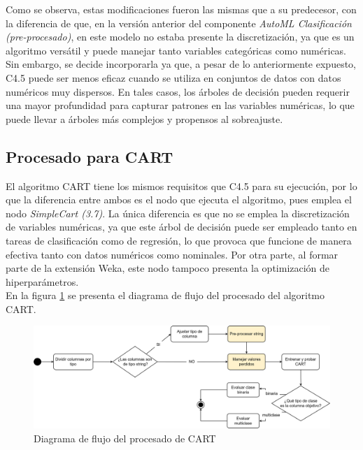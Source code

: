 Como se observa, estas modificaciones fueron las mismas que a su predecesor, con la diferencia de que, en la versión anterior del componente \textit{AutoML Clasificación (pre-procesado)}, en este modelo no estaba presente la discretización, ya que es un algoritmo versátil y puede manejar tanto variables categóricas como numéricas. Sin embargo, se decide incorporarla ya que, a pesar de lo anteriormente expuesto, C4.5 puede ser menos eficaz cuando se utiliza en conjuntos de datos con datos numéricos muy dispersos. En tales casos, los árboles de decisión pueden requerir una mayor profundidad para capturar patrones en las variables numéricas, lo que puede llevar a árboles más complejos y propensos al sobreajuste. 

\subsection{Procesado para CART}
El algoritmo CART tiene los mismos requisitos que C4.5 para su ejecución, por lo que la diferencia entre ambos es el nodo que ejecuta el algoritmo, pues emplea el nodo \textit{SimpleCart (3.7)}. La única diferencia es que no se emplea la discretización de variables numéricas, ya que este árbol de decisión puede ser empleado tanto en tareas de clasificación como de regresión, lo que provoca que funcione de manera efectiva tanto con datos numéricos como nominales. Por otra parte, al formar parte de la extensión Weka, este nodo tampoco presenta la optimización de hiperparámetros. \\
En la figura \ref{fig:procesado-cart} se presenta el diagrama de flujo del procesado del algoritmo CART.

\begin{figure}[H]
	\centering
	\includegraphics[width=1\linewidth]{"figuras/capi 2/modelos/procesado cart.drawio"}
	\caption{Diagrama de flujo del procesado de CART}
	\label{fig:procesado-cart}
\end{figure}


